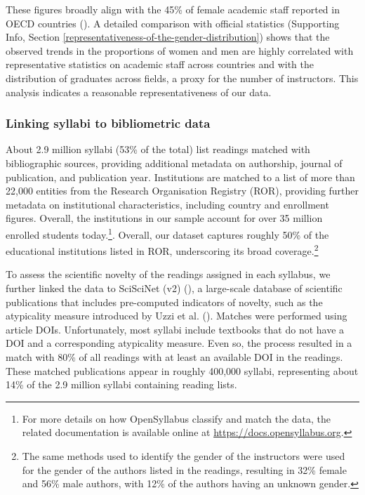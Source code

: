 \documentclass[
  british,
  12pt,
]{article}
\begin{document}
These figures broadly align with the 45\% of female academic staff reported in OECD countries (). A detailed comparison with official statistics (Supporting Info, Section \ref{representativeness-of-the-gender-distribution}) shows that the observed trends in the proportions of women and men are highly correlated with representative statistics on academic staff across countries and with the distribution of graduates across fields, a proxy for the number of instructors. This analysis indicates a reasonable representativeness of our data.

\subsubsection{Linking syllabi to bibliometric data}\label{linking-syllabi-to-bibliometric-data}

About 2.9 million syllabi (53\% of the total) list readings matched with bibliographic sources, providing additional metadata on authorship, journal of publication, and publication year. Institutions are matched to a list of more than 22,000 entities from the Research Organisation Registry (ROR), providing further metadata on institutional characteristics, including country and enrollment figures. Overall, the institutions in our sample account for over 35 million enrolled students today.\footnote{
  For more details on how OpenSyllabus classify and match the data, the related documentation is available online at \url{https://docs.opensyllabus.org}.}. Overall, our dataset captures roughly 50\% of the educational institutions listed in ROR, underscoring its broad coverage.\footnote{
  The same methods used to identify the gender of the instructors were used for the gender of the authors listed in the readings, resulting in 32\% female and 56\% male authors, with 12\% of the authors having an unknown gender.}

To assess the scientific novelty of the readings assigned in each syllabus, we further linked the data to SciSciNet (v2) (), a large-scale database of scientific publications that includes pre-computed indicators of novelty, such as the atypicality measure introduced by Uzzi et al. (). Matches were performed using article DOIs. Unfortunately, most syllabi include textbooks that do not have a DOI and a corresponding atypicality measure. Even so, the process resulted in a match with 80\% of all readings with at least an available DOI in the readings. These matched publications appear in roughly 400,000 syllabi, representing about 14\% of the 2.9 million syllabi containing reading lists.
\end{document}
